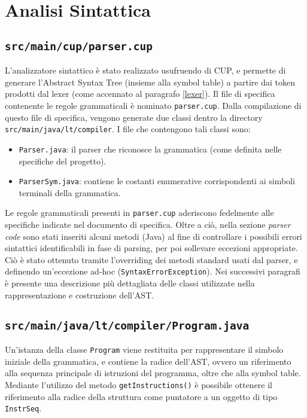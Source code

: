 \documentclass[10pt,a4paper]{article}
\begin{document}
\pagebreak

\section{Analisi Sintattica} \label{analisiSintattica}

\subsection{\texttt{src/main/cup/parser.cup}}
L'analizzatore sintattico è stato realizzato usufruendo di CUP, e permette di generare l'Abstract Syntax Tree (insieme alla symbol table) a partire dai token prodotti dal lexer (come accennato al paragrafo \ref{lexer}).
Il file di specifica contenente le regole grammaticali è nominato \texttt{parser.cup}.
Dalla compilazione di questo file di specifica, vengono generate due classi dentro la directory \texttt{src/main/java/lt/compiler}.
I file che contengono tali classi sono:
\begin{itemize}
    \item \texttt{Parser.java}: il parser che riconosce la grammatica (come definita nelle specifiche del progetto).
    \item \texttt{ParserSym.java}: contiene le costanti enumerative corrispondenti ai simboli terminali della grammatica.
\end{itemize}
Le regole grammaticali presenti in \texttt{parser.cup} aderiscono fedelmente alle specifiche indicate nel documento di specifica.
Oltre a ciò, nella sezione \textit{parser code} sono stati inseriti alcuni metodi (Java) al fine di controllare i possibili errori sintattici identificabili in fase di parsing, per poi sollevare eccezioni appropriate.
Ciò è stato ottenuto tramite l'overriding dei metodi standard usati dal parser, e definendo un'eccezione ad-hoc (\texttt{SyntaxErrorException}).
Nei successivi paragrafi è presente una descrizione più dettagliata delle classi utilizzate nella rappresentazione e costruzione dell'AST.

\subsection{\texttt{src/main/java/lt/compiler/Program.java}}
Un'istanza della classe \texttt{Program} viene restituita per rappresentare il simbolo iniziale della grammatica, e contiene la radice dell'AST, ovvero un riferimento alla sequenza principale di istruzioni del programma, oltre che alla symbol table.
Mediante l'utilizzo del metodo \texttt{getInstructions()} è possibile ottenere il riferimento alla radice della struttura come puntatore a un oggetto di tipo \texttt{InstrSeq}.
\end{document}
